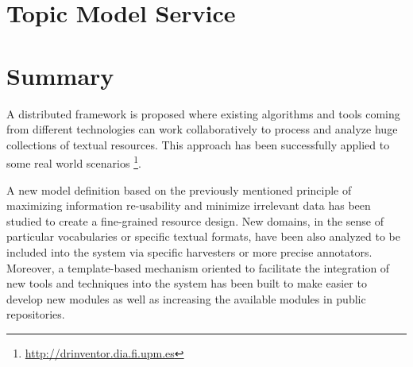 \section{Topic Model Service}

 





\section{Summary}

A distributed framework is proposed where existing algorithms and tools coming from different technologies can work collaboratively to process and analyze huge collections of textual resources. This approach has been successfully applied to some real world scenarios \footnote{\url{http://drinventor.dia.fi.upm.es}}.
 
A new model definition based on the previously mentioned principle of maximizing information re-usability and minimize irrelevant data has been studied to create a fine-grained resource design. New domains, in the sense of particular vocabularies or specific textual formats, have been also analyzed to be included into the system via specific harvesters or more precise annotators. Moreover, a template-based mechanism oriented to facilitate the integration of new tools and techniques into the system has been built to make easier to develop new modules as well as increasing the available modules in public repositories.